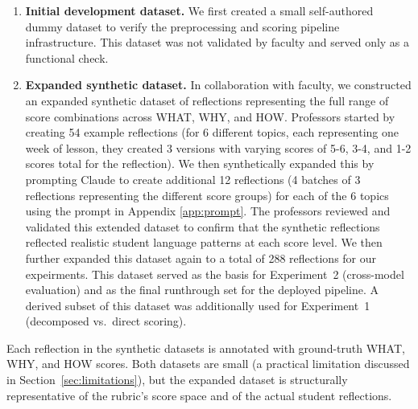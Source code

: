 \documentclass[11pt]{article}
\begin{document}
\begin{enumerate}
    \item \textbf{Initial development dataset.} We first created a small self-authored dummy dataset to verify the preprocessing and scoring pipeline infrastructure. This dataset was not validated by faculty and served only as a functional check.

    \item \textbf{Expanded synthetic dataset.} In collaboration with faculty, we constructed an expanded synthetic dataset of reflections representing the full range of score combinations across WHAT, WHY, and HOW. Professors started by creating 54 example reflections (for 6 different topics, each representing one week of lesson, they created 3 versions with varying scores of 5-6, 3-4, and 1-2 scores total for the reflection). We then synthetically expanded this by prompting Claude to create additional 12 reflections (4 batches of 3 reflections representing the different score groups) for each of the 6 topics using the prompt in Appendix \ref{app:prompt}. The professors reviewed and validated this extended dataset to confirm that the synthetic reflections reflected realistic student language patterns at each score level. We then further expanded this dataset again to a total of 288 reflections for our expeirments. This dataset served as the basis for Experiment~2 (cross-model evaluation) and as the final runthrough set for the deployed pipeline. A derived subset of this dataset was additionally used for Experiment~1 (decomposed vs.\ direct scoring).
\end{enumerate}

Each reflection in the synthetic datasets is annotated with ground-truth WHAT, WHY, and HOW scores. Both datasets are small (a practical limitation discussed in Section~\ref{sec:limitations}), but the expanded dataset is structurally representative of the rubric's score space and of the actual student reflections.


\end{document}
